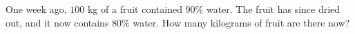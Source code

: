 One week ago, $100$ kg of a fruit contained $90\%$ water. The fruit has since dried out, and it now contains $80\%$ water. How many kilograms of fruit are there now?
